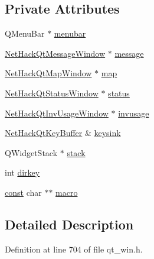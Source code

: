 \subsection*{Private Attributes}
\begin{DoxyCompactItemize}
\item 
Q\+Menu\+Bar $\ast$ \hyperlink{classNetHackQtMainWindow_a30875eb8c884592225cd51d0b575ce40}{menubar}
\item 
\hyperlink{classNetHackQtMessageWindow}{Net\+Hack\+Qt\+Message\+Window} $\ast$ \hyperlink{classNetHackQtMainWindow_a80922b351e3153d352c7eab13b0a5105}{message}
\item 
\hyperlink{classNetHackQtMapWindow}{Net\+Hack\+Qt\+Map\+Window} $\ast$ \hyperlink{classNetHackQtMainWindow_a868ce981d75ebdf4291f1bae7c73c14d}{map}
\item 
\hyperlink{classNetHackQtStatusWindow}{Net\+Hack\+Qt\+Status\+Window} $\ast$ \hyperlink{classNetHackQtMainWindow_ad809c0e1b9c110340bd2b5af80c109d3}{status}
\item 
\hyperlink{classNetHackQtInvUsageWindow}{Net\+Hack\+Qt\+Inv\+Usage\+Window} $\ast$ \hyperlink{classNetHackQtMainWindow_a25fced792d3869c6854a49bdcf1aed59}{invusage}
\item 
\hyperlink{classNetHackQtKeyBuffer}{Net\+Hack\+Qt\+Key\+Buffer} \& \hyperlink{classNetHackQtMainWindow_a53f62afd7386174f672bef8eff5ab2d5}{keysink}
\item 
Q\+Widget\+Stack $\ast$ \hyperlink{classNetHackQtMainWindow_ab8252d54de11cfecbb49a76434057797}{stack}
\item 
int \hyperlink{classNetHackQtMainWindow_af2c9180cade0145dd1c1eadace88504f}{dirkey}
\item 
\hyperlink{tradstdc_8h_a2c212835823e3c54a8ab6d95c652660e}{const} char $\ast$$\ast$ \hyperlink{classNetHackQtMainWindow_a89e6d35bbce108698a5b5062668d85fd}{macro}
\end{DoxyCompactItemize}


\subsection{Detailed Description}


Definition at line 704 of file qt\+\_\+win.\+h.



